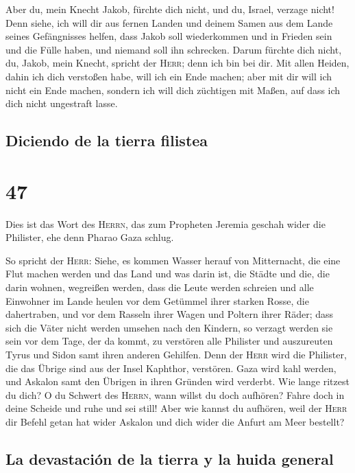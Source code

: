  Aber du, mein Knecht Jakob, fürchte dich nicht, und du,
Israel, verzage nicht! Denn siehe, ich will dir aus fernen Landen und
deinem Samen aus dem Lande seines Gefängnisses helfen, dass Jakob soll
wiederkommen und in Frieden sein und die Fülle haben, und niemand soll
ihn schrecken.  Darum fürchte dich nicht, du, Jakob, mein
Knecht, spricht der \textsc{Herr}; denn ich bin bei dir. Mit allen
Heiden, dahin ich dich verstoßen habe, will ich ein Ende machen; aber
mit dir will ich nicht ein Ende machen, sondern ich will dich züchtigen
mit Maßen, auf dass ich dich nicht ungestraft lasse.

\hypertarget{diciendo-de-la-tierra-filistea}{%
\subsection{Diciendo de la tierra
filistea}\label{diciendo-de-la-tierra-filistea}}

\hypertarget{section-46}{%
\section{47}\label{section-46}}

 Dies ist das Wort des \textsc{Herrn}, das zum Propheten
Jeremia geschah wider die Philister, ehe denn Pharao Gaza schlug.

 So spricht der \textsc{Herr}: Siehe, es kommen Wasser
herauf von Mitternacht, die eine Flut machen werden und das Land und was
darin ist, die Städte und die, die darin wohnen, wegreißen werden, dass
die Leute werden schreien und alle Einwohner im Lande heulen
 vor dem Getümmel ihrer starken Rosse, die dahertraben,
und vor dem Rasseln ihrer Wagen und Poltern ihrer Räder; dass sich die
Väter nicht werden umsehen nach den Kindern, so verzagt werden sie sein
 vor dem Tage, der da kommt, zu verstören alle Philister
und auszureuten Tyrus und Sidon samt ihren anderen Gehilfen. Denn der
\textsc{Herr} wird die Philister, die das Übrige sind aus der Insel
Kaphthor, verstören.  Gaza wird kahl werden, und Askalon
samt den Übrigen in ihren Gründen wird verderbt. Wie lange ritzest du
dich?  O du Schwert des \textsc{Herrn}, wann willst du
doch aufhören? Fahre doch in deine Scheide und ruhe und sei still!
 Aber wie kannst du aufhören, weil der \textsc{Herr} dir
Befehl getan hat wider Askalon und dich wider die Anfurt am Meer
bestellt?

\hypertarget{la-devastaciuxf3n-de-la-tierra-y-la-huida-general}{%
\subsection{La devastación de la tierra y la huida
general}\label{la-devastaciuxf3n-de-la-tierra-y-la-huida-general}}

